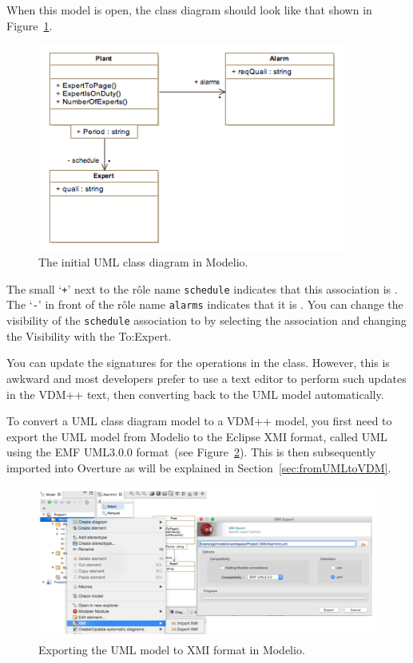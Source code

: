 %
When this model is open, the class diagram should look like that shown in Figure~\ref{fig:initialumlmodelio}.
%
\begin{figure}[htbp]
\begin{center}
\includegraphics[width=4in]{figures/initialumlmodelio}
\caption{The initial UML class diagram in Modelio.\label{fig:initialumlmodelio}}
\end{center}
\end{figure}
%
The small `\texttt{+}' next to the r\^{o}le name \texttt{schedule} indicates that this association is . The `\texttt{-}' in front of the r\^{o}le name \texttt{alarms} indicates that it is . You can change the visibility of the \texttt{schedule} association to  by selecting the association and changing the \textsf{Visibility} with the \textsf{To:Expert}.

You can update the signatures for the operations in the  class. However, this is awkward and most developers prefer to use a text editor to perform such updates in the VDM++ text, then converting back to the UML model automatically.

To convert a UML class diagram model to a VDM++ model, you first need to export the UML model from Modelio to the Eclipse XMI format, called UML using the EMF UML3.0.0 format~(see Figure~\ref{fig:xmiexportmodelio}). This is then subsequently imported into Overture as will be explained in Section~\ref{sec:fromUMLtoVDM}.
%
\begin{figure}[htbp]
\begin{center}
\includegraphics[width=4.5in]{figures/xmiexportmodelio}
\caption{Exporting the UML model to XMI format in Modelio.\label{fig:xmiexportmodelio}}
\end{center}
\end{figure}
%

